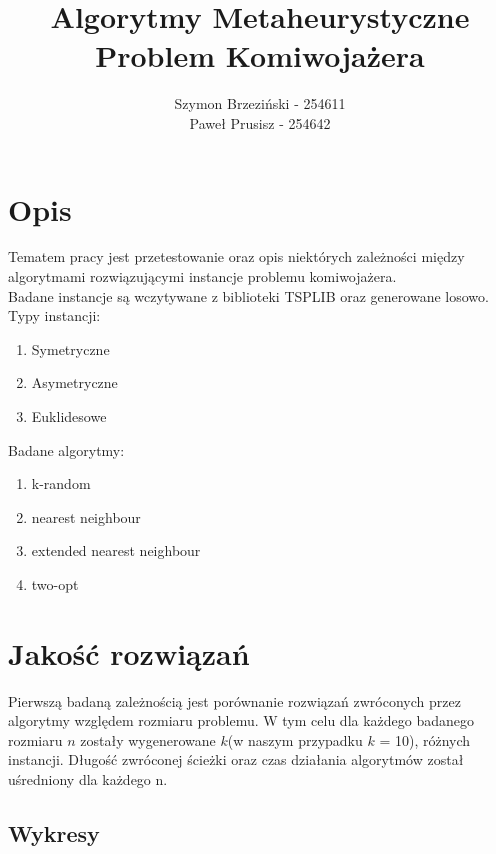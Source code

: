 \documentclass[11pt]{article}
\title{Algorytmy Metaheurystyczne\\\large Problem Komiwojażera}
\author{
        Szymon Brzeziński - 254611\\
        Paweł Prusisz - 254642
        }
\date{}
\begin{document}
\maketitle

\section{Opis}
Tematem pracy jest przetestowanie oraz opis niektórych zależności między algorytmami rozwiązującymi instancje problemu komiwojażera.
\\Badane instancje są wczytywane z biblioteki TSPLIB oraz generowane losowo.
\\Typy instancji:
\begin{enumerate}
    \item Symetryczne
    \item Asymetryczne
    \item Euklidesowe
\end{enumerate}
Badane algorytmy:
\begin{enumerate}
    \item k-random
    \item nearest neighbour
    \item extended nearest neighbour
    \item two-opt
\end{enumerate}

\section{Jakość rozwiązań }
Pierwszą badaną zależnością jest porównanie rozwiązań zwróconych przez algorytmy względem rozmiaru problemu. W tym celu dla każdego badanego rozmiaru  $n$ zostały wygenerowane $k$(w naszym przypadku $k$ = 10),  różnych instancji. Długość zwróconej ścieżki oraz czas działania algorytmów został uśredniony dla każdego n.
\subsection{Wykresy }
\end{document}
